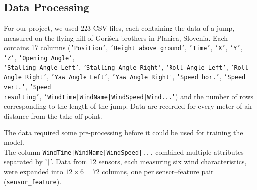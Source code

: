 \documentclass[sigconf,natbib=false, language=english]{acmart}
\begin{document}
\subsection{Data Processing}\label{sec:processing}


For our project, we used $223$ CSV files, each containing the data of a jump, measured on the flying hill of Gorišek brothers in Planica, Slovenia. 
Each contains 17 columns (\texttt{'Position'}, \texttt{'Height above ground'}, \texttt{'Time'}, \texttt{'X'}, \texttt{'Y'}, \texttt{'Z'}, 
\texttt{'Opening Angle'}, \\ \texttt{'Stalling Angle Left'}, \texttt{'Stalling Angle Right'}, 
\texttt{'Roll Angle Left'}, \texttt{'Roll Angle Right'}, \texttt{'Yaw Angle Left'}, \texttt{'Yaw Angle Right'}, 
\texttt{'Speed hor.'}, \texttt{'Speed vert.'}, \texttt{'Speed \\ resulting'},
\texttt{'WindTime|WindName|WindSpeed|Wind...'}) and the number of rows corresponding to the length of the jump. Data are recorded for every meter
of air distance from the take-off point.

The data required some pre-processing before it could be used for training the model.
\\ The column \texttt{WindTime|WindName|WindSpeed|...} combined multiple attributes separated by '\texttt{|}'. Data from 12 sensors, each measuring six wind characteristics, were expanded into $12 \times 6 = 72$ columns, one per sensor–feature pair (\texttt{sensor\_feature}).
\end{document}
